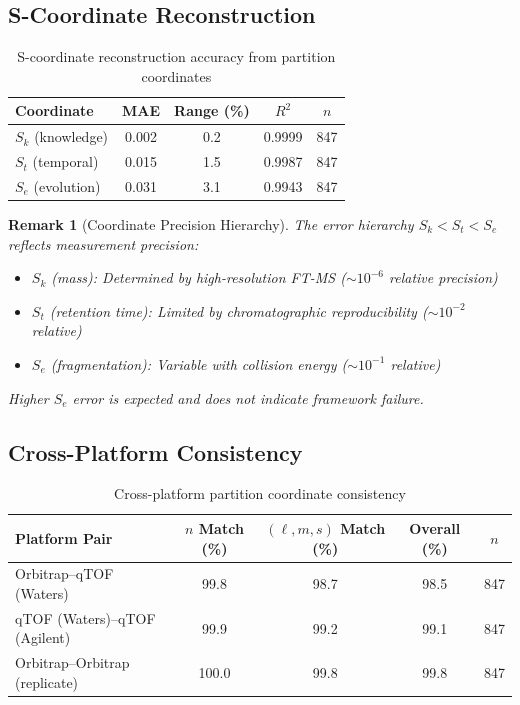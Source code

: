 \documentclass[twocolumn,10pt]{article}
\newtheorem{remark}[theorem]{Remark}
\begin{document}
\subsection{S-Coordinate Reconstruction}

\begin{table}[h]
\centering
\caption{S-coordinate reconstruction accuracy from partition coordinates}
\label{tab:scoord}
\begin{tabular}{lcccc}
\toprule
\textbf{Coordinate} & \textbf{MAE} & \textbf{Range (\%)} & \textbf{$R^2$} & \textbf{$n$} \\
\midrule
$S_k$ (knowledge) & 0.002 & 0.2 & 0.9999 & 847 \\
$S_t$ (temporal) & 0.015 & 1.5 & 0.9987 & 847 \\
$S_e$ (evolution) & 0.031 & 3.1 & 0.9943 & 847 \\
\bottomrule
\end{tabular}
\end{table}

\begin{remark}[Coordinate Precision Hierarchy]
The error hierarchy $S_k < S_t < S_e$ reflects measurement precision:
\begin{itemize}
    \item $S_k$ (mass): Determined by high-resolution FT-MS ($\sim 10^{-6}$ relative precision)
    \item $S_t$ (retention time): Limited by chromatographic reproducibility ($\sim 10^{-2}$ relative)
    \item $S_e$ (fragmentation): Variable with collision energy ($\sim 10^{-1}$ relative)
\end{itemize}
Higher $S_e$ error is expected and does not indicate framework failure.
\end{remark}

\subsection{Cross-Platform Consistency}

\begin{table}[h]
\centering
\caption{Cross-platform partition coordinate consistency}
\label{tab:crossplatform}
\begin{tabular}{lcccc}
\toprule
\textbf{Platform Pair} & \textbf{$n$ Match (\%)} & \textbf{$({\ell, m, s})$ Match (\%)} & \textbf{Overall (\%)} & \textbf{$n$} \\
\midrule
Orbitrap–qTOF (Waters) & 99.8 & 98.7 & 98.5 & 847 \\
qTOF (Waters)–qTOF (Agilent) & 99.9 & 99.2 & 99.1 & 847 \\
Orbitrap–Orbitrap (replicate) & 100.0 & 99.8 & 99.8 & 847 \\
\bottomrule
\end{tabular}
\end{table}
\end{document}

